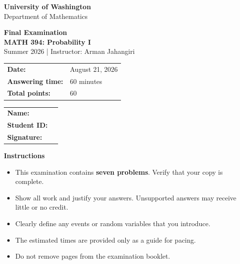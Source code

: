 \documentclass[11pt]{article}
\newcommand{\course}{MATH 394: Probability I}
\newcommand{\instructor}{Arman Jahangiri}
\newcommand{\department}{Department of Mathematics}
\newcommand{\university}{University of Washington}
\begin{document}
\begin{titlepage}
\centering
\vspace*{0.05cm}

{\Large \textbf{\university}}\\
{\large \department}

\vspace{0.28cm}

{\LARGE \color{uwpurple}\textbf{Final Examination}}\\[0.15cm]
{\Large \textbf{\course}}\\[0.15cm]
{\large Summer 2026 \quad | \quad Instructor: \instructor}

\vspace{0.22cm}

\begin{tcolorbox}[
    width=0.94\textwidth,
    colback=softpurple,
    colframe=uwpurple,
    boxrule=0.9pt,
    arc=3mm
]
\centering
\renewcommand{\arraystretch}{1.15}
\begin{tabular}{>{\bfseries}p{}p{}}
Date: & August 21, 2026 \\
Answering time: & 60 minutes \\
Total points: & 60 \\
\end{tabular}
\end{tcolorbox}

\vspace{0.18cm}

\begin{tcolorbox}[
    width=0.94\textwidth,
    colback=white,
    colframe=uwgold,
    boxrule=0.8pt,
    arc=3mm
]
\renewcommand{\arraystretch}{1.35}
\begin{tabular}{>{\bfseries}p{}p{}}
Name: & \hrulefill \\
Student ID: & \hrulefill \\
Signature: & \hrulefill \\
\end{tabular}
\end{tcolorbox}

\vspace{0.15cm}

\begin{policybox}
\small
\textbf{Instructions}
\begin{itemize}[leftmargin=*,itemsep=0.05em,topsep=0.15em,parsep=0pt]
    \item This examination contains \textbf{seven problems}. Verify that your copy is complete.
    \item Show all work and justify your answers. Unsupported answers may receive little or no credit.
    \item Clearly define any events or random variables that you introduce.
    \item The estimated times are provided only as a guide for pacing.
    \item Do not remove pages from the examination booklet.
\end{itemize}


\end{policybox}
\end{titlepage}
\end{document}
